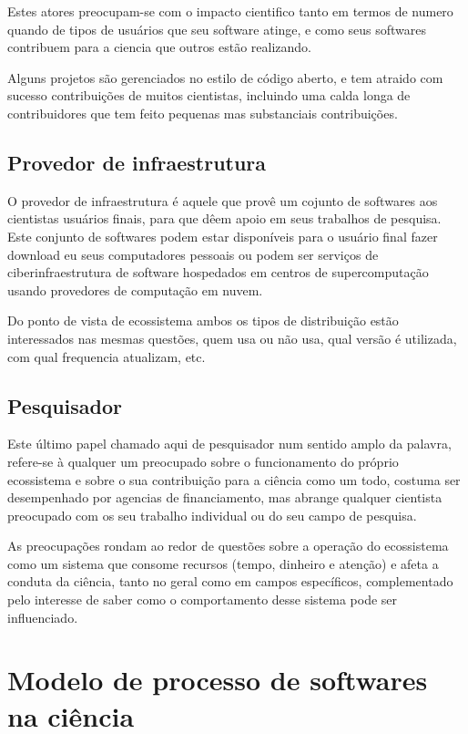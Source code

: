 Estes atores preocupam-se com o impacto cientifico tanto em termos de numero
quando de tipos de usuários que seu software atinge, e como seus softwares
contribuem para a ciencia que outros estão realizando.

Alguns projetos são gerenciados no estilo de código aberto, e tem atraido com
sucesso contribuições de muitos cientistas, incluindo uma calda longa de
contribuidores que tem feito pequenas mas substanciais contribuições.

\subsection{Provedor de infraestrutura}

O provedor de infraestrutura é aquele que provê um cojunto de softwares aos
cientistas usuários finais, para que dêem apoio em seus trabalhos de pesquisa.
Este conjunto de softwares podem estar disponíveis para o usuário final fazer
download eu seus computadores pessoais ou podem ser serviços de
ciberinfraestrutura de software hospedados em centros de supercomputação
usando provedores de computação em nuvem.

Do ponto de vista de ecossistema ambos os tipos de distribuição estão
interessados nas mesmas questões, quem usa ou não usa, qual versão é utilizada,
com qual frequencia atualizam, etc.

\subsection{Pesquisador}

Este último papel chamado aqui de pesquisador num sentido amplo da palavra,
refere-se à qualquer um preocupado sobre o funcionamento do próprio ecossistema
e sobre o sua contribuição para a ciência como um todo, costuma ser
desempenhado por agencias de financiamento, mas abrange qualquer cientista
preocupado com os seu trabalho individual ou do seu campo de pesquisa.

As preocupações rondam ao redor de questões sobre a operação do ecossistema como
um sistema que consome recursos (tempo, dinheiro e atenção) e afeta a conduta da
ciência, tanto no geral como em campos específicos, complementado pelo interesse
de saber como o comportamento desse sistema pode ser influenciado.

\section{Modelo de processo de softwares na ciência}


